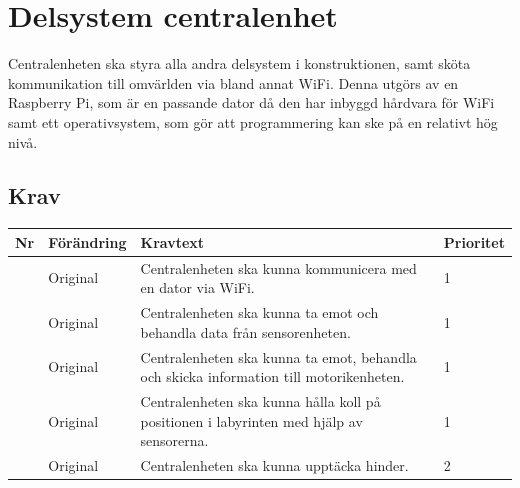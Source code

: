 \documentclass[a4paper,titlepage,12pt]{article}
\newcounter{reqNr}
\newcommand{\nextReqNr}{\stepcounter{reqNr}\arabic{reqNr}}
\begin{document}
	\section{Delsystem centralenhet}
	Centralenheten ska styra alla andra delsystem i konstruktionen, samt sköta
	kommunikation till omvärlden via bland annat WiFi. Denna utgörs av en Raspberry
	Pi, som är en passande dator då den har inbyggd hårdvara för WiFi samt
	ett operativsystem, som gör att programmering kan ske på en relativt hög nivå.

	\subsection{Krav}
	\begin{table}[h]
		\label{tab:label}
		\begin{tabularx}{\textwidth}{|c|l|X|l|}
			\hline
			\textbf{Nr} & \textbf{Förändring} & \textbf{Kravtext} & \textbf{Prioritet} 
				\\ \hline

			\nextReqNr & Original & Centralenheten ska kunna kommunicera 
				med en dator via WiFi. & 1
				\\ \hline

			\nextReqNr & Original & Centralenheten ska kunna ta emot och 
				behandla data från sensorenheten.& 1
				\\ \hline

			\nextReqNr & Original & Centralenheten ska kunna ta emot, 
				behandla och skicka information till motorikenheten. & 1
				\\ \hline

			\nextReqNr & Original & Centralenheten ska kunna hålla koll 
				på positionen i labyrinten med hjälp av sensorerna. & 1
				\\ \hline

			\nextReqNr & Original & Centralenheten ska kunna upptäcka hinder. & 2
			\\ \hline

		\end{tabularx}
	\end{table}



\end{document}
